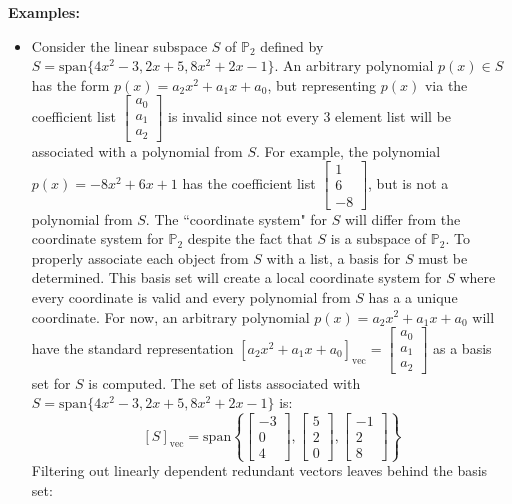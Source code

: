 \documentclass{article}
\begin{document}
\textbf{Examples:}
\begin{itemize}
\item Consider the linear subspace \(S\) of \(\mathbb{P}_2\) defined by \(S = \text{span}\{4x^2 - 3, 2x + 5, 8x^2 + 2x - 1\}\). An arbitrary polynomial \(p(x) \in S\) has the form \(p(x) = a_2 x^2 + a_1 x + a_0\), but representing \(p(x)\) via the coefficient list \(\begin{bmatrix} a_0 \\ a_1 \\ a_2 \end{bmatrix}\) is invalid since not every 3 element list will be associated with a polynomial from \(S\). For example, the polynomial \(p(x) = -8x^2 + 6x + 1\) has the coefficient list \(\begin{bmatrix} 1 \\ 6 \\ -8 \end{bmatrix}\), but is not a polynomial from \(S\). The ``coordinate system" for \(S\) will differ from the coordinate system for \(\mathbb{P}_2\) despite the fact that \(S\) is a subspace of \(\mathbb{P}_2\). To properly associate each object from \(S\) with a list, a basis for \(S\) must be determined. This basis set will create a local coordinate system for \(S\) where every coordinate is valid and every polynomial from \(S\) has a a unique coordinate. For now, an arbitrary polynomial \(p(x) = a_2 x^2 + a_1 x + a_0\) will have the standard representation \([a_2 x^2 + a_1 x + a_0]_{\text{vec}} = \begin{bmatrix} a_0 \\ a_1 \\ a_2 \end{bmatrix}\) as a basis set for \(S\) is computed. The set of lists associated with \(S = \text{span}\{4x^2 - 3, 2x + 5, 8x^2 + 2x - 1\}\) is: 
\[[S]_{\text{vec}} = \text{span}\left\{\begin{bmatrix} -3 \\ 0 \\ 4 \end{bmatrix}, \begin{bmatrix} 5 \\ 2 \\ 0 \end{bmatrix}, \begin{bmatrix} -1 \\ 2 \\ 8 \end{bmatrix}\right\}\]
Filtering out linearly dependent redundant vectors leaves behind the basis set:

\end{itemize}
\end{document}

